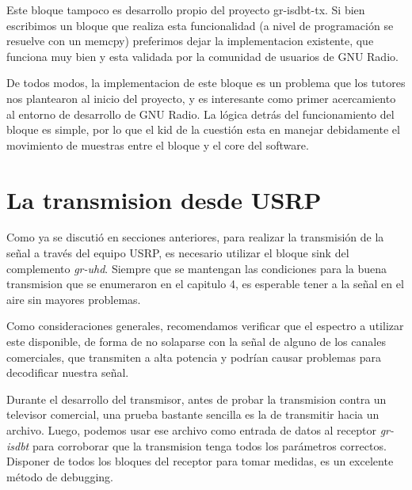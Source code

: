 Este bloque tampoco es desarrollo propio del proyecto gr-isdbt-tx. Si bien escribimos un bloque que realiza esta funcionalidad (a nivel de programación se resuelve con un memcpy) preferimos dejar la implementacion existente, que funciona muy bien y esta validada por la comunidad de usuarios de GNU Radio.

De todos modos, la implementacion de este bloque es un problema que los tutores nos plantearon al inicio del proyecto, y es interesante como primer acercamiento al entorno de desarrollo de GNU Radio. La lógica detrás del funcionamiento del bloque es simple, por lo que el kid de la cuestión esta en manejar debidamente el movimiento de muestras entre el bloque y el core del software.

\section{La transmision desde USRP}

Como ya se discutió en secciones anteriores, para realizar la transmisión de la señal a través del equipo USRP, es necesario utilizar el bloque sink del complemento \textit{gr-uhd}. Siempre que se mantengan las condiciones para la buena transmision que se enumeraron en el capitulo 4, es esperable tener a la señal en el aire sin mayores problemas. 

Como consideraciones generales, recomendamos verificar que el espectro a utilizar este disponible, de forma de no solaparse con la señal de alguno de los canales comerciales, que transmiten a alta potencia y podrían causar problemas para decodificar nuestra señal.

Durante el desarrollo del transmisor, antes de probar la transmision contra un televisor comercial, una prueba bastante sencilla es la de transmitir hacia un archivo. Luego, podemos usar ese archivo como entrada de datos al receptor \textit{gr-isdbt} para corroborar que la transmision tenga todos los parámetros correctos. Disponer de todos los bloques del receptor para tomar medidas, es un excelente método de debugging.